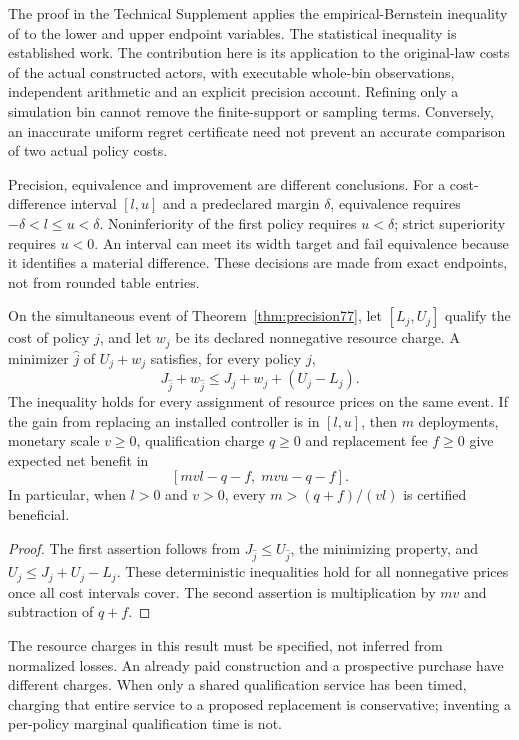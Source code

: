 The proof in the Technical Supplement applies the empirical-Bernstein inequality of \citet{maurer2009} to the lower and upper endpoint variables. The statistical inequality is established work. The contribution here is its application to the original-law costs of the actual constructed actors, with executable whole-bin observations, independent arithmetic and an explicit precision account. Refining only a simulation bin cannot remove the finite-support or sampling terms. Conversely, an inaccurate uniform regret certificate need not prevent an accurate comparison of two actual policy costs.

Precision, equivalence and improvement are different conclusions. For a cost-difference interval $[l,u]$ and a predeclared margin $\delta$, equivalence requires $-\delta<l\le u<\delta$. Noninferiority of the first policy requires $u<\delta$; strict superiority requires $u<0$. An interval can meet its width target and fail equivalence because it identifies a material difference. These decisions are made from exact endpoints, not from rounded table entries.

\begin{corollary}\label{cor:purchase77}
On the simultaneous event of Theorem~\ref{thm:precision77}, let $[L_j,U_j]$ qualify the cost of policy $j$, and let $w_j$ be its declared nonnegative resource charge. A minimizer $\widehat j$ of $U_j+w_j$ satisfies, for every policy $j$,
\[
 J_{\widehat j}+w_{\widehat j}
       \le J_j+w_j+(U_j-L_j).
\]
The inequality holds for every assignment of resource prices on the same event. If the gain from replacing an installed controller is in $[l,u]$, then $m$ deployments, monetary scale $v\ge0$, qualification charge $q\ge0$ and replacement fee $f\ge0$ give expected net benefit in
\[
 [mv l-q-f,\;mv u-q-f].
\]
In particular, when $l>0$ and $v>0$, every $m>(q+f)/(vl)$ is certified beneficial.
\end{corollary}
\begin{proof}
The first assertion follows from $J_{\widehat j}\le U_{\widehat j}$, the minimizing property, and $U_j\le J_j+U_j-L_j$. These deterministic inequalities hold for all nonnegative prices once all cost intervals cover. The second assertion is multiplication by $mv$ and subtraction of $q+f$.
\end{proof}

The resource charges in this result must be specified, not inferred from normalized losses. An already paid construction and a prospective purchase have different charges. When only a shared qualification service has been timed, charging that entire service to a proposed replacement is conservative; inventing a per-policy marginal qualification time is not.

